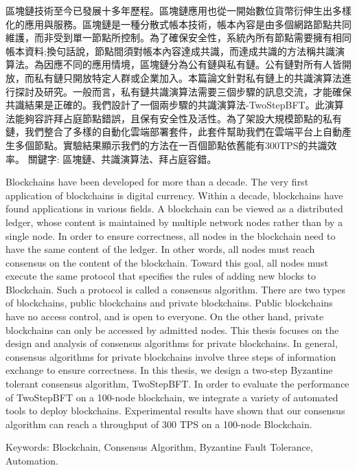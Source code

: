 \begin{abstractzh}
區塊鏈技術至今已發展十多年歷程。區塊鏈應用也從一開始數位貨幣衍伸生出多樣化的應用與服務。區塊鏈是一種分散式帳本技術，帳本內容是由多個網路節點共同維護，而非受到單一節點所控制。為了確保安全性，系統內所有節點需要擁有相同帳本資料;換句話說，節點間須對帳本內容達成共識，而達成共識的方法稱共識演算法。為因應不同的應用情境，區塊鏈分為公有鏈與私有鏈。公有鏈對所有人皆開放，而私有鏈只開放特定人群或企業加入。本篇論文針對私有鏈上的共識演算法進行探討及研究。一般而言，私有鏈共識演算法需要三個步驟的訊息交流，才能確保共識結果是正確的。我們設計了一個兩步驟的共識演算法-TwoStep­BFT。此演算法能夠容許拜占庭節點錯誤，且保有安全性及活性。為了架設大規模節點的私有鏈，我們整合了多樣的自動化雲端部署套件，此套件幫助我們在雲端平台上自動產生多個節點。實驗結果顯示我們的方法在一百個節點依舊能有300TPS的共識效率。
\noindent
關鍵字: 區塊鏈、共識演算法、拜占庭容錯。 
\end{abstractzh}

\begin{abstracten}
Blockchains have been developed for more than a decade. The very first application of blockchains is digital currency. Within a decade, blockchains have found applications in various fields. A blockchain can be viewed as a distributed ledger, whose content is maintained by multiple network nodes rather than by a single node. In order to ensure correctness, all nodes in the blockchain need to have the same content of the ledger. In other words, all nodes must reach consensus on the content of the blockchain. Toward this goal, all nodes must execute the same protocol that specifies the rules of adding new blocks to Blockchain. Such a protocol is called a consensus algorithm. There are two types of blockchains, public blockchains and private blockchains. Public blockchains have no access control, and is open to everyone. On the other hand, private blockchains can only be accessed by admitted nodes. This thesis focuses on the design and analysis of consensus algorithms for private blockchains. In general, consensus algorithms for private blockchains involve three steps of information exchange to ensure correctness. In this thesis, we design a two-step Byzantine tolerant consensus algorithm, TwoStepBFT. In order to evaluate the performance of TwoStepBFT on a 100-node blockchain, we integrate a variety of automated tools to deploy blockchains. Experimental results have shown that our consensus algorithm can reach a throughput of 300 TPS on a 100-node Blockchain.
	
\noindent
Keywords: Blockchain, Consensus Algorithm, Byzantine Fault Tolerance, Automation. 
\end{abstracten}
